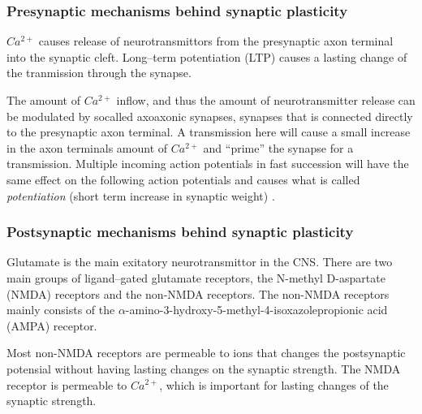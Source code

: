 \subsubsection{Presynaptic mechanisms behind synaptic plasticity}
$Ca^{2+}$ causes release of neurotransmittors from the presynaptic axon terminal into the synaptic cleft\cite{PrinciplesOfNeuralScience4edKAP10}. 
Long--term potentiation (LTP) causes a lasting change of the tranmission through the synapse.%

The amount of $Ca^{2+}$ inflow, and thus the amount of neurotransmitter release can be modulated by socalled axoaxonic synapses\cite{NeuroscienceExploringTheBrain3edKAP5}, synapses that is connected directly to the presynaptic axon terminal. 
A transmission here will cause a small increase in the axon terminals amount of $Ca^{2+}$ and ``prime'' the synapse for a transmission. 
Multiple incoming action potentials in fast succession will have the same effect on the following action potentials and causes what is called \emph{potentiation} (short term increase in synaptic weight)
\cite{PrinciplesOfNeuralScience4edKAP14}. 




\subsubsection{Postsynaptic mechanisms behind synaptic plasticity}
Glutamate is the main exitatory neurotransmittor in the CNS\cite{PrinciplesOfAnatomyAndPhysiology12edKAP12}. %
There are two main groups of ligand--gated glutamate receptors, the N-methyl D-aspartate (NMDA) receptors and the non-NMDA receptors. 
The non-NMDA receptors mainly consists of the $\alpha$-amino-3-hydroxy-5-methyl-4-isoxazolepropionic acid (AMPA) receptor. %

Most non-NMDA receptors are permeable to ions that changes the postsynaptic potensial without having lasting changes on the synaptic strength.%
The NMDA receptor is permeable to $Ca^{2+}$, which is important for lasting changes of the synaptic strength. %

